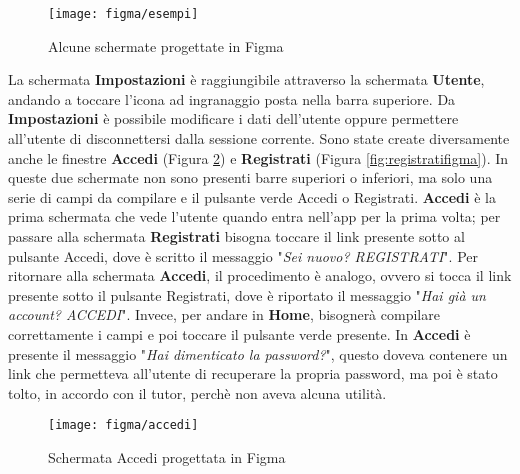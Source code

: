 \begin{figure}[!h]
    \centering 
    \texttt{[image: figma/esempi]} 
    \caption{Alcune schermate progettate in Figma}
    \label{fig:schermatefigma}
\end{figure}
La schermata \textbf{Impostazioni} è raggiungibile attraverso la schermata \textbf{Utente}, andando a toccare l'icona ad ingranaggio posta nella barra superiore.\newline
Da \textbf{Impostazioni} è possibile modificare i dati dell'utente oppure permettere all'utente di disconnettersi dalla sessione corrente.\newline
\newline
Sono state create diversamente anche le finestre \textbf{Accedi} (Figura \ref{fig:accedifigma}) e \textbf{Registrati} (Figura \ref{fig:registratifigma}).\newline
In queste due schermate non sono presenti barre superiori o inferiori, ma solo una serie di campi da compilare e il pulsante verde Accedi o Registrati.\newline
\textbf{Accedi} è la prima schermata che vede l'utente quando entra nell'app per la prima volta; per passare alla schermata \textbf{Registrati} bisogna toccare il link presente sotto al pulsante Accedi, dove è scritto il messaggio "\emph{Sei nuovo? REGISTRATI}".\newline
Per ritornare alla schermata \textbf{Accedi}, il procedimento è analogo, ovvero si tocca il link presente sotto il pulsante Registrati, dove è riportato il messaggio "\emph{Hai già un account? ACCEDI}".\newline
Invece, per andare in \textbf{Home}, bisognerà compilare correttamente i campi e poi toccare il pulsante verde presente.\newline
\newline
In \textbf{Accedi} è presente il messaggio "\emph{Hai dimenticato la password?}", questo doveva contenere un link che permetteva all'utente di recuperare la propria password, ma poi è stato tolto, in accordo con il tutor, perchè non aveva alcuna utilità.\newline
\begin{figure}[!h] 
    \centering 
    \texttt{[image: figma/accedi]} 
    \caption{Schermata Accedi progettata in Figma}
    \label{fig:accedifigma}
\end{figure}
